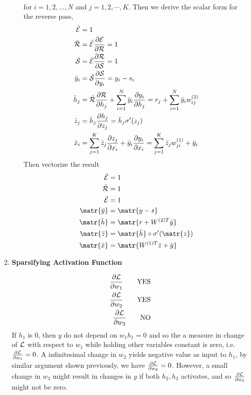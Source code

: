 \documentclass[11pt]{article}
\begin{document}
\begin{enumerate}
\begin{enumerate}
\begin{solution}
\begin{align*}
        \end{align*}
        for $i=1,2,\dots, N$ and $j=1,2,\cdots, K$. Then we derive the scalar form for the reverse pass, 
        \begin{align*}
            \bar{\mathcal{E}} &= 1 \\
            \bar{\mathcal{R}} &= \bar{\mathcal{E}} \frac{\partial \mathcal{E}}{\partial \mathcal{R}} = 1 \\ 
            \bar{\mathcal{S}} &= \bar{\mathcal{E}} \frac{\partial \mathcal{R}}{\partial \mathcal{S}} = 1 \\
            \bar{y}_i   &= \bar{\mathcal{S}} \frac{\partial \mathcal{S}}{\partial y_i} = y_i - s_i \\ 
            \bar{h}_j   &= \bar{\mathcal{R}} \frac{\partial \mathcal{R}}{\partial h_j} + \sum_{i=1}^N \bar{y}_i \frac{\partial y_i}{\partial h_j} = r_j + \sum_{i=1}^N \bar{y}_i w_{ij}^{(2)} \\
            \bar{z}_j   &= \bar{h}_j \frac{\partial h_j}{\partial z_j} = \bar{h}_j \sigma'(z_j) \\
            \bar{x}_i   &= \sum_{j=1}^K \bar{z}_j \frac{\partial z_j}{\partial x_i} + \bar{y}_i \frac{\partial y_i}{\partial x_i} = \sum_{j=1}^K \bar{z}_j w_{ji}^{(1)} + \bar{y}_i
        \end{align*}
        Then vectorize the result 
        \begin{align*}
            \bar{\calE} &= 1\\
            \bar{\calR} &= 1\\
            \bar{\calE} &= 1 \\
            \matr{\bar{y}} &= \matr{y-s} \\
            \matr{\bar{h}} &= \matr{r + W^{(2)T} \bar{y}} \\
            \matr{\bar{z}} &= \matr{\bar{h}} \circ \sigma'(\matr{z}) \\ 
            \matr{\bar{x}} &=  \matr{W^{(1)T} \bar{z} + \bar{y}} \\ 
        \end{align*}
    \end{solution}
\end{enumerate}

\item \textbf{Sparsifying Activation Function} 
\begin{solution}
    \begin{align*}
        \frac{\partial \mathcal{L}}{\partial w_1} \quad \quad \text{YES} \\ 
        \frac{\partial \mathcal{L}}{\partial w_2} \quad \quad \text{YES} \\ 
        \frac{\partial \mathcal{L}}{\partial w_3} \quad \quad \text{NO} \\ 
    \end{align*}
    If $h_1$ is 0, then $y$ do not depend on $w_1h_1 = 0$ and so the a measure in change of $\mathcal{L}$ with respect to $w_1$ while holding other variables constant is zero, i.e. $\frac{\partial \mathcal{L}}{\partial w_1} = 0$. A infinitesimal change in $w_2$ yields negative value as input to $h_1$, by similar argument shown previously, we have $\frac{\partial \mathcal{L}}{\partial w_2} = 0$. However, a small change in $w_3$ might result in changes in $y$ if both $h_2, h_3$ activates, and so $\frac{\partial \mathcal{L}}{\partial w_3}$ might not be zero.
    

\end{solution}
\end{enumerate}
\end{document}
